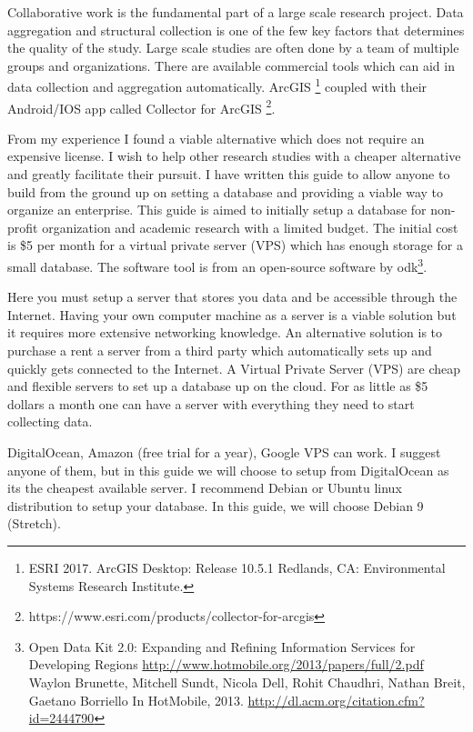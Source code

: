 

Collaborative work is the fundamental part of a large scale research project.  Data aggregation and structural collection is one of the few key factors that determines the quality of the study. Large scale studies are often done by a team of multiple groups and organizations. There are available commercial tools which can aid in data collection and aggregation automatically. ArcGIS \footnote{ESRI 2017. ArcGIS Desktop: Release 10.5.1 Redlands, CA: Environmental Systems Research Institute.} coupled with their Android/IOS app called Collector for ArcGIS \footnote{https://www.esri.com/products/collector-for-arcgis}.

From my experience I found a viable alternative which does not require an expensive license. I wish to help other research studies with a cheaper alternative and greatly facilitate their pursuit. I have written this guide to allow anyone to build from the ground up on setting a database and providing a viable way to organize an enterprise. This guide is aimed to initially setup a database for non-profit organization and academic research with a limited budget. The initial cost is \$5 per month for a virtual private server (VPS) which has enough storage for a small database.  The software tool is from an open-source software by \gls{odk}\footnote{Open Data Kit 2.0: Expanding and Refining Information Services for Developing Regions \url{http://www.hotmobile.org/2013/papers/full/2.pdf} Waylon Brunette, Mitchell Sundt, Nicola Dell, Rohit Chaudhri, Nathan Breit, Gaetano Borriello In HotMobile, 2013. \url{http://dl.acm.org/citation.cfm?id=2444790}}.


Here you must setup a server that stores you data and be accessible through the Internet. Having your own computer machine as a server is a viable solution but it requires more extensive networking knowledge. An alternative solution is to purchase a rent a server from a third party which automatically sets up and quickly gets connected to the Internet. A Virtual Private Server (VPS) are cheap and flexible servers to set up a database up on the cloud. For as little as \$5 dollars a month one can have a server with everything they need to start collecting data.

DigitalOcean, Amazon (free trial for a year), Google VPS can work. I suggest anyone of them, but in this guide we will choose to setup from DigitalOcean as its the cheapest available server. I recommend Debian or Ubuntu linux distribution to setup your database. In this guide, we will choose Debian 9 (Stretch).

